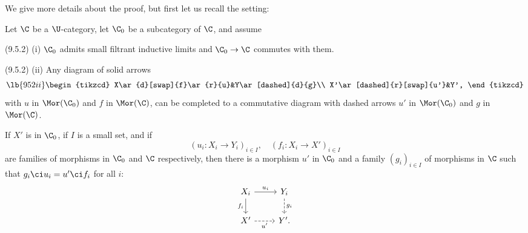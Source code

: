 \documentclass[12pt]{article}
\theoremstyle{remark}
\theoremstyle{definition}
\begin{document}


We give more details about the proof, but first let us recall the setting:

Let $\C$ be a $\U$-category, let $\C_0$ be a subcategory of $\C$, and assume 

\nn(9.5.2) (i) $\C_0$ admits small filtrant inductive limits and $\C_0\to\C$ commutes with them.

\nn(9.5.2) (ii) Any diagram of solid arrows
%
\begin{equation}\lb{952ii}
\begin{tikzcd}
X\ar{d}[swap]{f}\ar{r}{u}&Y\ar[dashed]{d}{g}\\ 
X'\ar[dashed]{r}[swap]{u'}&Y',
\end{tikzcd}
\end{equation}
%
with $u$ in $\Mor(\C_0)$ and $f$ in $\Mor(\C)$, can be completed to a commutative diagram with dashed arrows $u'$ in $\Mor(\C_0)$ and $g$ in $\Mor(\C)$.

\begin{lem}[Lemma 9.5.3 p. 231]
If $X'$ is in $\C_0$, if $I$ is a small set, and if  
$$
(u_i:X_i\to Y_i)_{i\in I},\quad(f_i:X_i\to X')_{i\in I}
$$ 
are families of morphisms in $\C_0$ and $\C$ respectively, then there is a morphism $u'$ in $\C_0$ and a family $(g_i)_{i\in I}$ of morphisms in $\C$ such that $g_i\ci u_i=u'\ci f_i$ for all $i$:
$$
\begin{tikzcd}
X_i\ar{d}[swap]{f_i}\ar{r}{u_i}&Y_i\ar[dashed]{d}{g_i}\\ 
X'\ar[dashed]{r}[swap]{u'}&Y'.
\end{tikzcd}
$$ 
\end{lem}
\end{document}
